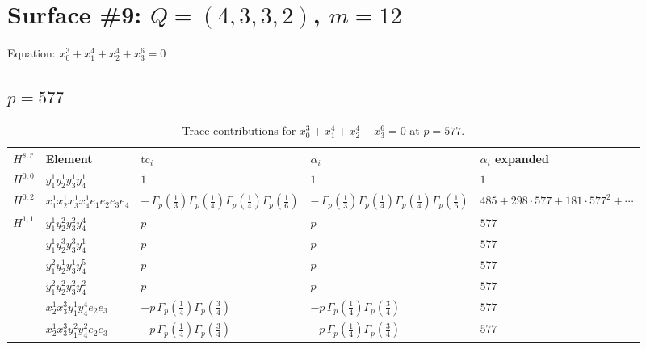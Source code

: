 \documentclass[11pt]{article}
\begin{document}
\newpage

\section*{Surface \#9: $Q=(4, 3, 3, 2)$, $m=12$}

Equation: $x_0^{3} + x_1^{4} + x_2^{4} + x_3^{6} = 0$

\subsection*{$p = 577$}

\begin{table}[ht]
\centering
\caption{Trace contributions for $x_0^{3} + x_1^{4} + x_2^{4} + x_3^{6} = 0$ at $p=577$.}\label{tab:diagonal-9}
\renewcommand{\arraystretch}{1.1}
{\scriptsize
\begin{tabular}{@{}lllll@{}}
\toprule
$H^{s,r}$ & Element & $\mathrm{tc}_i$ & $\alpha_i$ & $\alpha_i$ expanded \\
\midrule
$H^{0,0}$ & $y_{1}^{1} y_{2}^{1} y_{3}^{1} y_{4}^{1}$ & $1$ & $1$ & $1$ \\
\midrule
$H^{0,2}$ & $x_{1}^{1} x_{2}^{1} x_{3}^{1} x_{4}^{1}  e_{1} e_{2} e_{3} e_{4}$ & $- \, \Gamma_p \left( \frac{1}{3} \right) \Gamma_p \left( \frac{1}{4} \right) \Gamma_p \left( \frac{1}{4} \right) \Gamma_p \left( \frac{1}{6} \right)$ & $- \, \Gamma_p \left( \frac{1}{3} \right) \Gamma_p \left( \frac{1}{4} \right) \Gamma_p \left( \frac{1}{4} \right) \Gamma_p \left( \frac{1}{6} \right)$ & $485{+}298{\cdot}577{+}181{\cdot}577^{2}{+}\cdots$ \\
\midrule
$H^{1,1}$ & $y_{1}^{1} y_{2}^{2} y_{3}^{2} y_{4}^{4}$ & $p \,$ & $p \,$ & $577$ \\
 & $y_{1}^{1} y_{2}^{3} y_{3}^{3} y_{4}^{1}$ & $p \,$ & $p \,$ & $577$ \\
 & $y_{1}^{2} y_{2}^{1} y_{3}^{1} y_{4}^{5}$ & $p \,$ & $p \,$ & $577$ \\
 & $y_{1}^{2} y_{2}^{2} y_{3}^{2} y_{4}^{2}$ & $p \,$ & $p \,$ & $577$ \\
 & $x_{2}^{1} x_{3}^{3} y_{1}^{1} y_{4}^{4} e_{2} e_{3}$ & $- p \, \Gamma_p \left( \frac{1}{4} \right) \Gamma_p \left( \frac{3}{4} \right)$ & $- p \, \Gamma_p \left( \frac{1}{4} \right) \Gamma_p \left( \frac{3}{4} \right)$ & $577$ \\
 & $x_{2}^{1} x_{3}^{3} y_{1}^{2} y_{4}^{2} e_{2} e_{3}$ & $- p \, \Gamma_p \left( \frac{1}{4} \right) \Gamma_p \left( \frac{3}{4} \right)$ & $- p \, \Gamma_p \left( \frac{1}{4} \right) \Gamma_p \left( \frac{3}{4} \right)$ & $577$ \\

\end{tabular}}
\end{table}
\end{document}
